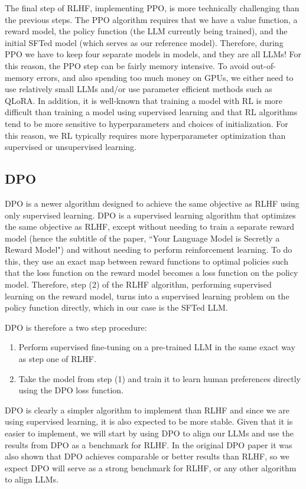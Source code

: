 \documentclass[11pt, oneside]{article}   	%
\begin{document}
The final step of RLHF, implementing PPO, is more technically challenging than the previous steps.
The PPO algorithm requires that we have a value function, a reward model, the policy function (the LLM currently being trained), and the initial SFTed model (which serves as our reference model). 
Therefore, during PPO we have to keep four separate models in models, and they are all LLMs!
For this reason, the PPO step can be fairly memory intensive.
To avoid out-of-memory errors, and also spending too much money on GPUs, we either need to use relatively small LLMs and/or use parameter efficient methods such as QLoRA.
In addition, it is well-known that training a model with RL is more difficult than training a model using supervised learning and that RL algorithms tend to be more sensitive to hyperparameters and choices of initialization.
For this reason, we RL typically requires more hyperparameter optimization than supervised or unsupervised learning.

\subsection{DPO}
DPO is a newer algorithm designed to achieve the same objective as RLHF using only supervised learning.
DPO is a supervised learning algorithm that optimizes the same objective as RLHF, except without needing to train a separate reward model (hence the subtitle of the paper, ``Your Language Model is Secretly a Reward Model") and without needing to perform reinforcement learning.
To do this, they use an exact map between reward functions to optimal policies such that the loss function on the reward model becomes a loss function on the policy model.
Therefore, step (2) of the RLHF algorithm, performing supervised learning on the reward model, turns into a supervised learning problem on the policy function directly, which in our case is the SFTed LLM.

DPO is therefore a two step procedure:
\begin{enumerate}
\item Perform supervised fine-tuning on a pre-trained LLM in the same exact way as step one of RLHF.
\item Take the model from step (1) and train it to learn human preferences directly using the DPO loss function.  
\end{enumerate} 

DPO is clearly a simpler algorithm to implement than RLHF and since we are using supervised learning, it is also expected to be more stable.
Given that it is easier to implement, we will start by using DPO to align our LLMs and use the results from DPO as a benchmark for RLHF. 
In the original DPO paper it was also shown that DPO achieves comparable or better results than RLHF, so we expect DPO will serve as a strong benchmark for RLHF, or any other algorithm to align LLMs. 
\end{document}

